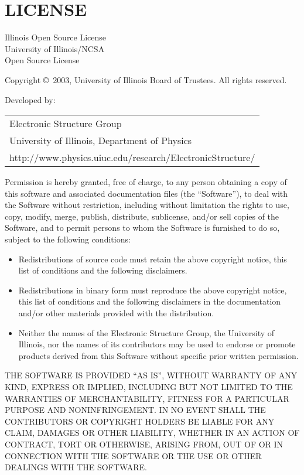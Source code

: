 \section{LICENSE}

\begin{center}
Illinois Open Source License \\
University of Illinois/NCSA \\
Open Source License \\
\end{center}

Copyright \copyright~2003, University of Illinois Board of Trustees.
All rights reserved.

Developed by:
\begin{table}[h]
\begin{tabular}{l}
Electronic Structure Group \\
University of Illinois, Department of Physics \\
http://www.physics.uiuc.edu/research/ElectronicStructure/
\end{tabular}
\end{table}

Permission is hereby granted, free of charge, to any person obtaining a
copy of this software and associated documentation files (the
``Software''), to deal with the Software without restriction, including
without limitation the rights to use, copy, modify, merge, publish,
distribute, sublicense, and/or sell copies of the Software, and to
permit persons to whom the Software is furnished to do so, subject to
the following conditions:

\begin{itemize}
\item Redistributions of source code must retain the above copyright
  notice, this list of conditions and the following disclaimers.
\item Redistributions in binary form must reproduce the above copyright
  notice, this list of conditions and the following disclaimers in the
  documentation and/or other materials provided with the distribution.
\item Neither the names of the Electronic Structure Group, the
  University of Illinois, nor the names of its contributors may be used
  to endorse or promote products derived from this Software without
  specific prior written permission.
\end{itemize}

THE SOFTWARE IS PROVIDED ``AS IS'', WITHOUT WARRANTY OF ANY KIND,
EXPRESS OR IMPLIED, INCLUDING BUT NOT LIMITED TO THE WARRANTIES OF
MERCHANTABILITY, FITNESS FOR A PARTICULAR PURPOSE AND NONINFRINGEMENT.
IN NO EVENT SHALL THE CONTRIBUTORS OR COPYRIGHT HOLDERS BE LIABLE FOR
ANY CLAIM, DAMAGES OR OTHER LIABILITY, WHETHER IN AN ACTION OF CONTRACT,
TORT OR OTHERWISE, ARISING FROM, OUT OF OR IN CONNECTION WITH THE
SOFTWARE OR THE USE OR OTHER DEALINGS WITH THE SOFTWARE.

